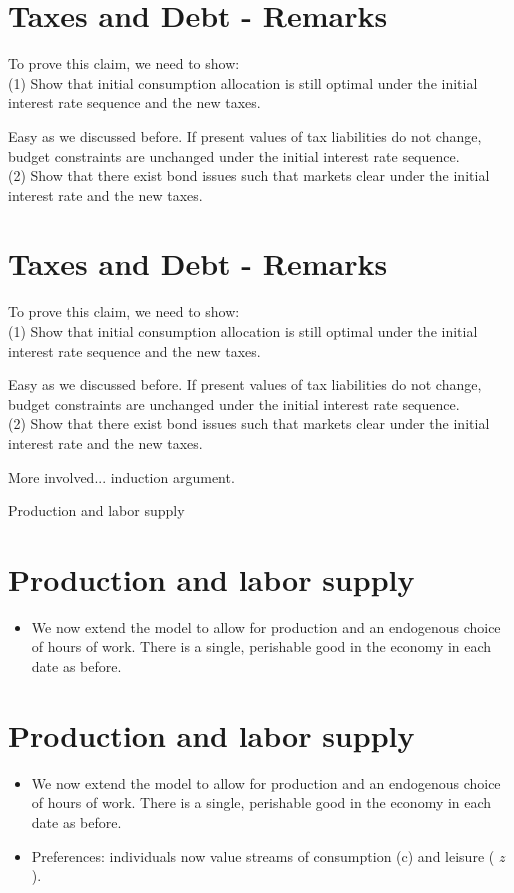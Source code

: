 \documentclass[10pt]{article}
\begin{document}
\section*{Taxes and Debt - Remarks}
To prove this claim, we need to show:\\
(1) Show that initial consumption allocation is still optimal under the initial interest rate sequence and the new taxes.

Easy as we discussed before. If present values of tax liabilities do not change, budget constraints are unchanged under the initial interest rate sequence.\\
(2) Show that there exist bond issues such that markets clear under the initial interest rate and the new taxes.

\section*{Taxes and Debt - Remarks}
To prove this claim, we need to show:\\
(1) Show that initial consumption allocation is still optimal under the initial interest rate sequence and the new taxes.

Easy as we discussed before. If present values of tax liabilities do not change, budget constraints are unchanged under the initial interest rate sequence.\\
(2) Show that there exist bond issues such that markets clear under the initial interest rate and the new taxes.

More involved... induction argument.

Production and labor supply

\section*{Production and labor supply}
\begin{itemize}
  \item We now extend the model to allow for production and an endogenous choice of hours of work. There is a single, perishable good in the economy in each date as before.
\end{itemize}

\section*{Production and labor supply}
\begin{itemize}
  \item We now extend the model to allow for production and an endogenous choice of hours of work. There is a single, perishable good in the economy in each date as before.
  \item Preferences: individuals now value streams of consumption (c) and leisure ( $z$ ).
\end{itemize}
\end{document}
